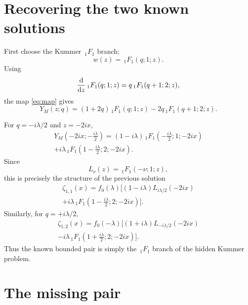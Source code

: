 \documentclass[%
 aip,
 jmp,%
 amsmath,amssymb,
 reprint,%
]{revtex4-2}
\begin{document}
\section{Recovering the two known solutions}

First choose the Kummer $\,_1F_1$ branch:
\begin{equation}
w(z)=\,_1F_1(q;1;z).
\end{equation}
Using
\begin{equation}
\dv{}{z}\,_1F_1(q;1;z)=q\,_1F_1(q+1;2;z),
\end{equation}
the map \eqref{eq:map} gives
\begin{equation}
\label{eq:Mbranch}
Y_M(z;q)
=(1+2q)\,_1F_1(q;1;z)
-2q\,_1F_1(q+1;2;z).
\end{equation}

For $q=-i\lambda/2$ and $z=-2ix$,
\begin{equation}
\label{eq:known1bare}
\begin{multlined}
Y_M\left(-2ix;-\frac{i\lambda}{2}\right)
=(1-i\lambda)\,_1F_1\left(-\frac{i\lambda}{2};1;-2ix\right)\\
+i\lambda\,_1F_1\left(1-\frac{i\lambda}{2};2;-2ix\right).
\end{multlined}
\end{equation}
Since
\begin{equation}
L_{\nu}(z)=\,_1F_1(-\nu;1;z),
\end{equation}
this is precisely the structure of the previous solution
\begin{equation}
\label{eq:zeta11}
\begin{multlined}
\zeta_{1,1}(x)
=f_0(\lambda)
\Bigg[
(1-i\lambda)L_{i\lambda/2}(-2ix)\\
+i\lambda\,_1F_1\left(1-\frac{i\lambda}{2};2;-2ix\right)
\Bigg].
\end{multlined}
\end{equation}
Similarly, for $q=+i\lambda/2$,
\begin{equation}
\label{eq:zeta12}
\begin{multlined}
\zeta_{1,2}(x)
=f_0(-\lambda)
\Bigg[
(1+i\lambda)L_{-i\lambda/2}(-2ix)\\
-i\lambda\,_1F_1\left(1+\frac{i\lambda}{2};2;-2ix\right)
\Bigg].
\end{multlined}
\end{equation}
Thus the known bounded pair is simply the $\,_1F_1$ branch of the hidden
Kummer problem.

\section{The missing pair}
\end{document}
